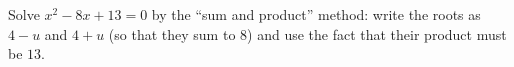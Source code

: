 Solve $x^2-8x+13=0$ by the ``sum and product'' method: write the roots as $4-u$ and $4+u$ (so that they sum to $8$) and use the fact that their product must be $13$.
